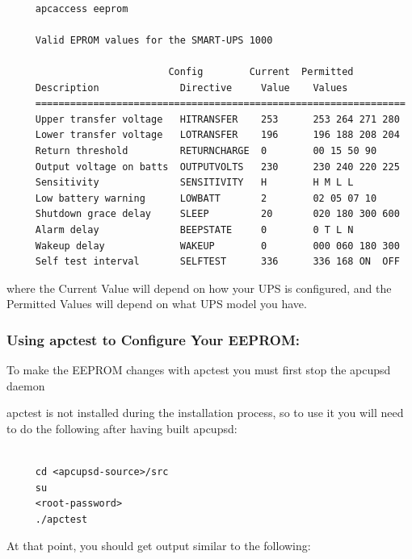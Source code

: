 {{{{{{{{{\footnotesize
\begin{verbatim}
     
     apcaccess eeprom
     
     Valid EPROM values for the SMART-UPS 1000
     
                            Config        Current  Permitted
     Description              Directive     Value    Values
     ================================================================
     Upper transfer voltage   HITRANSFER    253      253 264 271 280
     Lower transfer voltage   LOTRANSFER    196      196 188 208 204
     Return threshold         RETURNCHARGE  0        00 15 50 90
     Output voltage on batts  OUTPUTVOLTS   230      230 240 220 225
     Sensitivity              SENSITIVITY   H        H M L L
     Low battery warning      LOWBATT       2        02 05 07 10
     Shutdown grace delay     SLEEP         20       020 180 300 600
     Alarm delay              BEEPSTATE     0        0 T L N
     Wakeup delay             WAKEUP        0        000 060 180 300
     Self test interval       SELFTEST      336      336 168 ON  OFF
\end{verbatim}
\normalsize

where the Current Value will depend on how your UPS is configured, and the
Permitted Values will depend on what UPS model you have. 

\label{Using-apctest-to-Configure-Your-EEPROM}

\subsubsection*{Using apctest to Configure Your EEPROM:}

\label{index-eeprom_002c-apctest-142}
\label{index-apctest-setting-eeprom-143}
To make the EEPROM changes with apctest you must first stop the apcupsd daemon
 

apctest is not installed during the installation process, so to use it you
will need to do the following after having built apcupsd: 

\footnotesize
\begin{verbatim}
     
     cd <apcupsd-source>/src
     su
     <root-password>
     ./apctest
\end{verbatim}
\normalsize

At that point, you should get output similar to the following: 

\footnotesize
\begin{verbatim}
     

\end{verbatim}}}}}}}}}}
